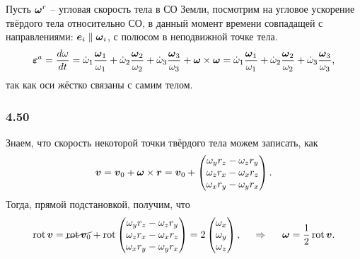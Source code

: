 Пусть $\mbox{\boldmath $\omega$}^r$ -- угловая скорость тела в СО Земли, посмотрим на угловое ускорение твёрдого тела относительно СО, в данный момент времени совпадащей с направлениями: $\mbox{\boldmath $e$}_i \parallel \mbox{\boldmath $\omega$}_i$, с полюсом в неподвижной точке тела.
$$
    \mbox{\boldmath $\varepsilon$}^a = \frac{d \omega}{d t} = 
    \dot{\omega}_1 \frac{\mbox{\boldmath $\omega$}_1}{\omega_1} +
    \dot{\omega}_2 \frac{\mbox{\boldmath $\omega$}_2}{\omega_2} +
    \dot{\omega}_3 \frac{\mbox{\boldmath $\omega$}_3}{\omega_3} + \mbox{\boldmath $\omega$} \times \mbox{\boldmath $\omega$} = 
    \dot{\omega}_1 \frac{\mbox{\boldmath $\omega$}_1}{\omega_1} +
    \dot{\omega}_2 \frac{\mbox{\boldmath $\omega$}_2}{\omega_2} +
    \dot{\omega}_3 \frac{\mbox{\boldmath $\omega$}_3}{\omega_3},
$$
так как оси жёстко связаны с самим телом.


\subsubsection*{4.50}

Знаем, что скорость некоторой точки твёрдого тела можем записать, как
$$
    \mbox{\boldmath $v$} = \mbox{\boldmath $v$}_0 + \mbox{\boldmath $\omega$}\times \mbox{\boldmath $r$} = \mbox{\boldmath $v$}_0 + \begin{pmatrix}
        \omega_y r_z - \omega_z r_y \\
        \omega_z r_x - \omega_x r_z \\
        \omega_x r_y - \omega_y r_x
    \end{pmatrix}.
$$
Тогда, прямой подстановкой, получим, что
$$
    \mathop{\mathrm{rot}}\nolimits \mbox{\boldmath $v$} = \cancel{\mathop{\mathrm{rot}}\nolimits \mbox{\boldmath $v$}_0} +
    \mathop{\mathrm{rot}}\nolimits \begin{pmatrix}
        \omega_y r_z - \omega_z r_y \\
        \omega_z r_x - \omega_x r_z \\
        \omega_x r_y - \omega_y r_x
    \end{pmatrix} =
    2 \begin{pmatrix}
        \omega_x \\ \omega_y \\ \omega_z
    \end{pmatrix},
    \hspace{0.5cm} \Rightarrow \hspace{0.5cm} 
    \mbox{\boldmath $\omega$} = \frac{1}{2} \mathop{\mathrm{rot}}\nolimits \mbox{\boldmath $v$} .
$$
